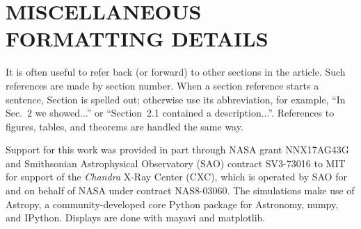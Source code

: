 \documentclass[]{spie}  %
\begin{document}
\appendix    %

\section{MISCELLANEOUS FORMATTING DETAILS}
\label{sec:misc}

It is often useful to refer back (or forward) to other sections in the article.  Such references are made by section number.  When a section reference starts a sentence, Section is spelled out; otherwise use its abbreviation, for example, ``In Sec.~2 we showed...'' or ``Section~2.1 contained a description...''.  References to figures, tables, and theorems are handled the same way.


\acknowledgments %
Support for this work was provided in part through NASA grant NNX17AG43G and Smithsonian Astrophysical Observatory (SAO)
contract SV3-73016 to MIT for support of the {\em Chandra} X-Ray Center (CXC),
which is operated by SAO for and on behalf of NASA under contract NAS8-03060.
The simulations make use of Astropy, a community-developed core Python package
for Astronomy\cite{astropy1,astropy2}, numpy\cite{numpy}, and
IPython\cite{IPython}. Displays are done with mayavi\cite{mayavi} and matplotlib\cite{matplotlib}.


\end{document}
